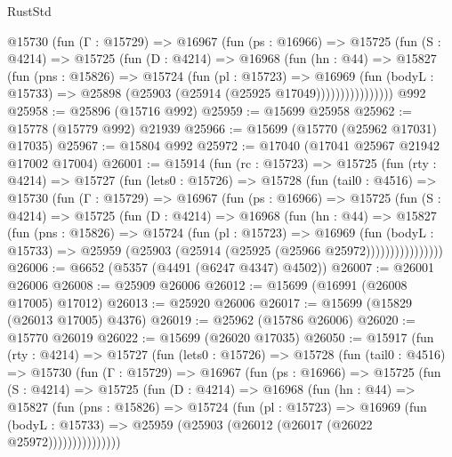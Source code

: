 \begin{lexlean}{RustStd}
\begin{coremodule}
            @15730
              (fun (Γ : @15729) =>
              @16967
                (fun (ps : @16966) =>
                @15725
                  (fun (S : @4214) =>
                  @15725
                    (fun (D : @4214) =>
                    @16968
                      (fun (hn : @44) =>
                      @15827
                        (fun (pns : @15826) =>
                        @15724
                          (fun (pl : @15723) =>
                          @16969
                            (fun (bodyL : @15733) =>
                            @25898 (@25903 (@25914 (@25925 @17049))))))))))))))))
    @992
@25958 := @25896 (@15716 @992)
@25959 := @15699 @25958
@25962 := @15778 (@15779 @992) @21939
@25966 := @15699 (@15770 (@25962 @17031) @17035)
@25967 := @15804 @992
@25972 := @17040 (@17041 @25967 @21942 @17002 @17004)
@26001 := @15914
    (fun (rc : @15723) =>
    @15725
      (fun (rty : @4214) =>
      @15727
        (fun (lets0 : @15726) =>
        @15728
          (fun (tail0 : @4516) =>
          @15730
            (fun (Γ : @15729) =>
            @16967
              (fun (ps : @16966) =>
              @15725
                (fun (S : @4214) =>
                @15725
                  (fun (D : @4214) =>
                  @16968
                    (fun (hn : @44) =>
                    @15827
                      (fun (pns : @15826) =>
                      @15724
                        (fun (pl : @15723) =>
                        @16969
                          (fun (bodyL : @15733) =>
                          @25959 (@25903 (@25914 (@25925 (@25966 @25972))))))))))))))))
@26006 := @6652 (@5357 (@4491 (@6247 @4347) @4502))
@26007 := @26001 @26006
@26008 := @25909 @26006
@26012 := @15699 (@16991 (@26008 @17005) @17012)
@26013 := @25920 @26006
@26017 := @15699 (@15829 (@26013 @17005) @4376)
@26019 := @25962 (@15786 @26006)
@26020 := @15770 @26019
@26022 := @15699 (@26020 @17035)
@26050 := @15917
    (fun (rty : @4214) =>
    @15727
      (fun (lets0 : @15726) =>
      @15728
        (fun (tail0 : @4516) =>
        @15730
          (fun (Γ : @15729) =>
          @16967
            (fun (ps : @16966) =>
            @15725
              (fun (S : @4214) =>
              @15725
                (fun (D : @4214) =>
                @16968
                  (fun (hn : @44) =>
                  @15827
                    (fun (pns : @15826) =>
                    @15724
                      (fun (pl : @15723) =>
                      @16969
                        (fun (bodyL : @15733) =>
                        @25959 (@25903 (@26012 (@26017 (@26022 @25972)))))))))))))))

\end{coremodule}
\end{lexlean}
